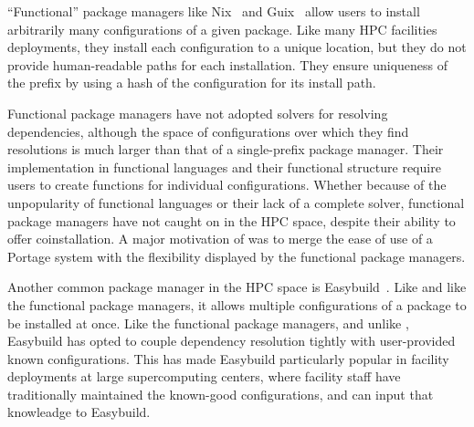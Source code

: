``Functional'' package managers like Nix~\cite{dolstra+:icfp08,dolstra+:lisa04} and Guix~\cite{courtes-guix-2015} allow users to install arbitrarily many configurations of a given package.
Like many HPC facilities deployments, they install each configuration to a unique location, but they do not provide human-readable paths for each installation.
They ensure uniqueness of the prefix by using a hash of the configuration for its install path.

Functional package managers have not adopted solvers for resolving dependencies, although the space of configurations over which they find resolutions is much larger than that of a single-prefix package manager.
Their implementation in functional languages and their functional structure require users to create functions for individual configurations.
Whether because of the unpopularity of functional languages or their lack of a complete solver, functional package managers have not caught on in the HPC space, despite their ability to offer coinstallation.
A major motivation of \spack was to merge the ease of use of a Portage system with the flexibility displayed by the functional package managers.

Another common package manager in the HPC space is Easybuild~\cite{hoste+:pyhpc12}.
Like \spack and like the functional package managers, it allows multiple configurations of a package to be installed at once.
Like the functional package managers, and unlike \spack, Easybuild has opted to couple dependency resolution tightly with user-provided known configurations.
This has made Easybuild particularly popular in facility deployments at large supercomputing centers, where facility staff have traditionally maintained the known-good configurations, and can input that knowleadge to Easybuild.
